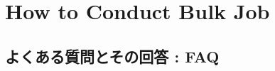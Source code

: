 \documentclass[a4paper]{jreport}
\begin{document}
 \chapter{How to Conduct Bulk Job}
  




\begin{appendix}
%
%
\chapter{よくある質問とその回答 : FAQ} \label{achap:practice}


\end{appendix}

\ClearWallPaper

\end{document}
